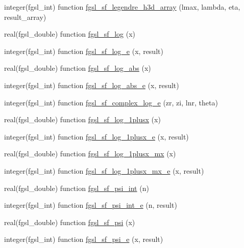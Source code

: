 \begin{DoxyCompactItemize}
\item 
integer(fgsl\-\_\-int) function \hyperlink{specfunc_8finc_a2168d8994e50a077a9f362e01867f0dc}{fgsl\-\_\-sf\-\_\-legendre\-\_\-h3d\-\_\-array} (lmax, lambda, eta, result\-\_\-array)
\item 
real(fgsl\-\_\-double) function \hyperlink{specfunc_8finc_a11c53d41419d49626362b644dff29fe4}{fgsl\-\_\-sf\-\_\-log} (x)
\item 
integer(fgsl\-\_\-int) function \hyperlink{specfunc_8finc_acba32e298535b22e43bec80c9964e3c1}{fgsl\-\_\-sf\-\_\-log\-\_\-e} (x, result)
\item 
real(fgsl\-\_\-double) function \hyperlink{specfunc_8finc_a0f6de609e56b2190101659007e284343}{fgsl\-\_\-sf\-\_\-log\-\_\-abs} (x)
\item 
integer(fgsl\-\_\-int) function \hyperlink{specfunc_8finc_adb97222a064d07be2bf6df44f4d8121b}{fgsl\-\_\-sf\-\_\-log\-\_\-abs\-\_\-e} (x, result)
\item 
integer(fgsl\-\_\-int) function \hyperlink{specfunc_8finc_af917d4b6a5658b1827d0485e5f3b62d8}{fgsl\-\_\-sf\-\_\-complex\-\_\-log\-\_\-e} (zr, zi, lnr, theta)
\item 
real(fgsl\-\_\-double) function \hyperlink{specfunc_8finc_a33af9ff7d269f4f075be7fa05b56d292}{fgsl\-\_\-sf\-\_\-log\-\_\-1plusx} (x)
\item 
integer(fgsl\-\_\-int) function \hyperlink{specfunc_8finc_a19fdda460dd1ff4a4e95e9e5a50eaa33}{fgsl\-\_\-sf\-\_\-log\-\_\-1plusx\-\_\-e} (x, result)
\item 
real(fgsl\-\_\-double) function \hyperlink{specfunc_8finc_a053c501251b69c88d8f66d602bccd6c2}{fgsl\-\_\-sf\-\_\-log\-\_\-1plusx\-\_\-mx} (x)
\item 
integer(fgsl\-\_\-int) function \hyperlink{specfunc_8finc_aa37478c65e0ec41374adacdbaff2756e}{fgsl\-\_\-sf\-\_\-log\-\_\-1plusx\-\_\-mx\-\_\-e} (x, result)
\item 
real(fgsl\-\_\-double) function \hyperlink{specfunc_8finc_ab3c88437981ec1773582b6268cb4ac73}{fgsl\-\_\-sf\-\_\-psi\-\_\-int} (n)
\item 
integer(fgsl\-\_\-int) function \hyperlink{specfunc_8finc_a11370016efa890eccd3ad164f2c7d5fe}{fgsl\-\_\-sf\-\_\-psi\-\_\-int\-\_\-e} (n, result)
\item 
real(fgsl\-\_\-double) function \hyperlink{specfunc_8finc_ae2ad3b35d7a4796bafff5acea65b806c}{fgsl\-\_\-sf\-\_\-psi} (x)
\item 
integer(fgsl\-\_\-int) function \hyperlink{specfunc_8finc_abaab30a9208765ca24711fcb5535e566}{fgsl\-\_\-sf\-\_\-psi\-\_\-e} (x, result)

\end{DoxyCompactItemize}
